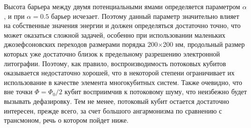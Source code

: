 Высота барьера между двумя потенциальными ямами определяется параметром $\alpha$, и при $\alpha=0.5$ барьер исчезает. Поэтому данный параметр значительно влияет на собственные значения энергии и должен определяться достаточно точно, что может оказаться сложной задачей, особенно при использовании маленьких джозефсоновских переходов размерами порядка 200$\times$200 нм, продольный размер которых уже достаточно близок к предельному разрешению электронной литографии. Поэтому, как правило, воспроизводимость потоковых кубитов оказывается недостаточно хорошей, что в некоторой степени ограничивает их использование в качестве элемента многокубитных систем. Также очевидно, что вне точки $\Phi=\Phi_0/2$ кубит восприимчив к потоковому шуму, что неизбежно будет вызывать дефазировку. Тем не менее, потоковый кубит остается достаточно интересен, прежде всего, за счет большого ангармонизма по сравнению с трансмоном, речь о котором пойдет ниже.  
